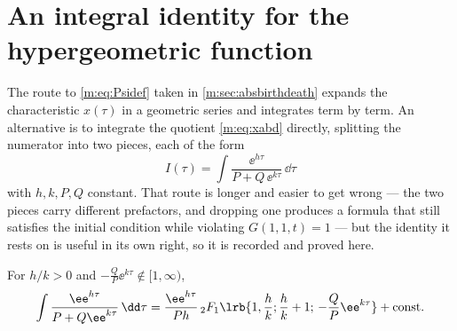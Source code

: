\renewcommand{\thesection}{\thechapter.\Alph{section}}
\setcounter{section}{0}

\section{An integral identity for the hypergeometric function}
\label{m:app:hyp}

The route to \cref{m:eq:Psidef} taken in \cref{m:sec:absbirthdeath} expands the
characteristic $x(\tau)$ in a geometric series and integrates term by term. An
alternative is to integrate the quotient \cref{m:eq:xabd} directly, splitting the
numerator into two pieces, each of the form
\begin{equation}
\label{m:eq:Iform}
I(\tau) = \int\frac{\ee^{h\tau}}{P+Q\,\ee^{k\tau}}\,\dd\tau
\end{equation}
with $h,k,P,Q$ constant. That route is longer and easier to get wrong --- the two
pieces carry different prefactors, and dropping one produces a formula that still
satisfies the initial condition while violating $G(1,1,t)=1$ --- but the identity it
rests on is useful in its own right, so it is recorded and proved here.

\begin{proposition}
\label{m:prop:hypIden}
For $h/k>0$ and $-\tfrac{Q}{P}\ee^{k\tau}\notin[1,\infty)$,
\begin{equation}
\label{m:eq:hypIden}
\int\frac{\ee^{h\tau}}{P+Q\ee^{k\tau}}\,\dd\tau
= \frac{\ee^{h\tau}}{Ph}\,{}_2F_1\lrb{1,\frac{h}{k};\frac{h}{k}+1;\,-\frac{Q}{P}\ee^{k\tau}}
+ \text{const} .
\end{equation}
\end{proposition}

